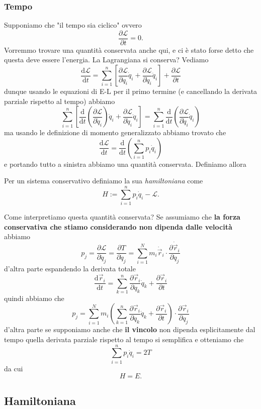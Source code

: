 \documentclass[11pt]{scrartcl}
\newcommand{\dif}{\text{d}}
\newcommand{\posit}{\vec{r}}
\newcommand{\veloc}{\dot{\vec{r}}}
\begin{document}
	\subsubsection{Tempo}
	Supponiamo che "il tempo sia ciclico" ovvero
	$$\frac{\partial \mathcal{L}}{\partial t}=0.$$
	Vorremmo trovare una quantità conservata anche qui, e ci è stato forse detto che questa deve essere l'energia. La Lagrangiana si conserva? Vediamo
	$$\frac{\dif \mathcal{L}}{\dif t}=\sum_{i=1}^{n}\left[\frac{\partial \mathcal{L}}{\partial q_i}\dot{q}_i+\frac{\partial \mathcal{L}}{\partial \dot{q}_i}\ddot{q}_i\right]+\frac{\partial \mathcal{L}}{\partial t}$$
	dunque usando le equazioni di E-L per il primo termine (e cancellando la derivata parziale rispetto al tempo) abbiamo
	$$\sum_{i=1}^{n}\left[\frac{\dif}{\dif t}\left(\frac{\partial \mathcal{L}}{\partial \dot{q}_i}\right)\dot{q}_i+\frac{\partial \mathcal{L}}{\partial \dot{q}_i}\ddot{q}_i\right]=\sum_{i=1}^n\frac{\dif}{\dif t}\left(\frac{\partial \mathcal{L}}{\partial \dot{q}_i} \dot{q}_i\right)$$
	ma usando le definizione di momento generalizzato abbiamo trovato che 
	$$\frac{\dif\mathcal{L}}{\dif t}=\frac{\dif}{\dif t}\left(\sum_{i=1}^{n}p_i \dot{q}_i\right)$$
	e portando tutto a sinistra abbiamo una quantità conservata. Definiamo allora
	\begin{definition}[Hamiltoniana]
		Per un sistema conservativo definiamo la sua \textit{hamiltoniana} come
		$$H:=\sum_{i=1}^{n}p_i \dot{q}_i -\mathcal{L}.$$
	\end{definition}
	Come interpretiamo questa quantità conservata? Se assumiamo che \textbf{la forza conservativa che stiamo considerando non dipenda dalle velocità} abbiamo
	$$p_j=\frac{\partial\mathcal{L}}{\partial \dot{q}_j}=\frac{\partial T}{\partial \dot{q}_j}=\sum_{i=1}^{N}m_i \veloc_i\cdot \frac{\partial \veloc_i}{\partial \dot{q}_j}$$
	d'altra parte espandendo la derivata totale 
	$$\frac{\dif \posit_i}{\dif t}=\sum_{k=1}^{n}\frac{\partial\posit_i}{\partial q_k}\dot{q}_k+\frac{\partial \posit_i}{\partial t}$$
	quindi abbiamo che
	$$p_j=\sum_{i=1}^{N}m_i \left(\sum_{k=1}^{n}\frac{\partial\posit_i}{\partial q_k}\dot{q}_k+\frac{\partial \posit_i}{\partial t}\right)\cdot \frac{\partial \posit_i}{\partial q_j}$$
	d'altra parte se supponiamo anche che \textbf{il vincolo} non dipenda esplicitamente dal tempo quella derivata parziale rispetto al tempo si semplifica e otteniamo che
	$$\sum_{i=1}^{n}p_i \dot{q}_i=2T$$
	da cui 
	$$H=E.$$
	\newpage
	
	\subsection{Hamiltoniana}
	
\end{document}
